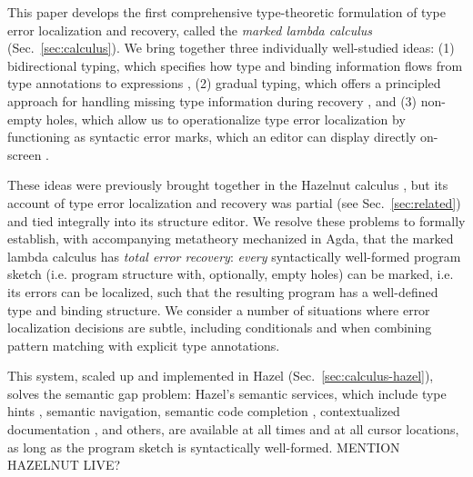 This paper develops the first comprehensive {type-theoretic formulation} of type error localization and recovery, called the \emph{marked lambda calculus} (Sec.~\ref{sec:calculus}).
We bring together three individually well-studied ideas: (1) bidirectional typing, which specifies how type and binding information flows from 
type annotations to expressions \cite{pierce,BidirTyping}, (2) gradual typing, which offers a principled approach for handling missing type information during recovery \cite{GradualTyping,sieksnapl}, and 
(3) non-empty holes, which allow us to operationalize type error localization by functioning as syntactic error marks, which an editor can display directly on-screen \cite{HazelnutPOPL}.

These ideas were previously brought together in the Hazelnut calculus \cite{HazelnutPOPL}, but its account of type error localization and recovery was partial (see Sec.~\ref{sec:related}) and tied integrally into its structure editor. 
We resolve these problems to formally establish, with accompanying metatheory mechanized in Agda, that the marked lambda calculus has \emph{total error recovery}: \emph{every} syntactically well-formed program sketch (i.e. program structure with, optionally, empty holes) can be marked, i.e. its errors can be localized, such that the resulting program has a well-defined type and binding structure.
We consider a number of situations where error localization decisions are subtle, including conditionals and when combining pattern matching with explicit type annotations.

This system, scaled up and implemented in Hazel (Sec.~\ref{sec:calculus-hazel}), solves the semantic gap problem: Hazel's semantic services, which include type hints \cite{potter1}, semantic navigation, semantic code completion \cite{potter1,blinn}, contextualized documentation \cite{potter2}, and others, 
are available at all times and at all cursor locations, as long as the program sketch is syntactically well-formed. MENTION HAZELNUT LIVE?

